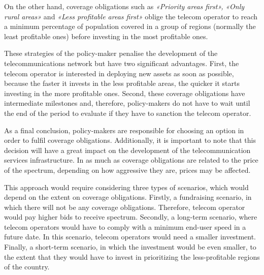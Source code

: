On the other hand, coverage obligations such as \textit{«Priority areas first»,} \textit{«Only rural areas» }and\textit{ «Less profitable areas first»} oblige the telecom operator to reach a minimum percentage of population covered in a group of regions (normally the least profitable ones) before investing in the most profitable ones.\par

These strategies of the policy-maker penalise the development of the telecommunications network but have two significant advantages. First, the telecom operator is interested in deploying new assets as soon as possible, because the faster it invests in the less profitable areas, the quicker it starts investing in the more profitable ones. Second, these coverage obligations have intermediate milestones and, therefore, policy-makers do not have to wait until the end of the period to evaluate if they have to sanction the telecom operator.\par

As a final conclusion, policy-makers are responsible for choosing an option in order to fulfil coverage obligations. Additionally, it is important to note that this decision will have a great impact on the development of the telecommunication services infrastructure. In as much as coverage obligations are related to the price of the spectrum, depending on how aggressive they are, prices may be affected. \par

This approach would require considering three types of scenarios, which would depend on the extent on coverage obligations. Firstly, a fundraising scenario, in which there will not be any coverage obligations. Therefore, telecom operator would pay higher bids to receive spectrum. Secondly, a long-term scenario, where telecom operators would have to comply with a minimum end-user speed in a future date. In this scenario, telecom operators would need a smaller investment. Finally, a short-term scenario, in which the investment would be even smaller, to the extent that they would have to invest in prioritizing the less-profitable regions of the country.\par





